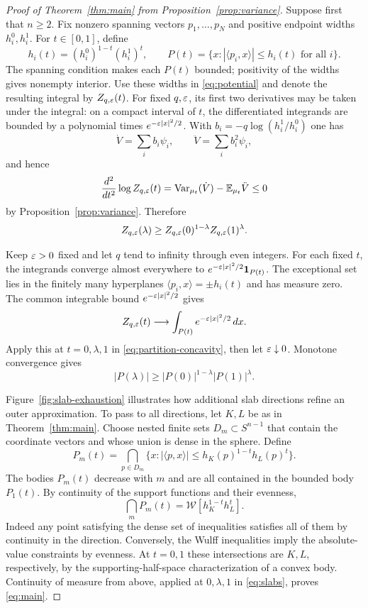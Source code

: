 \begin{proof}[Proof of Theorem~\ref{thm:main} from Proposition~\ref{prop:variance}]
Suppose first that $n\ge2$. Fix nonzero spanning vectors
$p_1,\ldots,p_N$ and positive endpoint widths $h_i^0,h_i^1$. For
$t\in[0,1]$, define
\[
 h_i(t)=(h_i^0)^{1-t}(h_i^1)^t,\qquad
 P(t)=\{x:|\langle p_i,x\rangle|\le h_i(t)\text{ for all }i\}.
\]
The spanning condition makes each $P(t)$ bounded; positivity of the
widths gives nonempty interior. Use these widths in \eqref{eq:potential}
and denote the resulting integral by $Z_{q,\varepsilon}(t)$.
For fixed $q,\varepsilon$, its first two derivatives may be taken under the
integral: on a compact interval of $t$, the differentiated integrands
are bounded by a polynomial times $e^{-\varepsilon|x|^2/2}$.
With $b_i=-q\log(h_i^1/h_i^0)$ one has
\[
 \dot V=\sum_i b_i\psi_i,\qquad
 \ddot V=\sum_i b_i^2\psi_i,
\]
and hence
\[
 \frac{d^2}{dt^2}\log Z_{q,\varepsilon}(t)
 =\operatorname{Var}_{\mu_t}(\dot V)-\mathbb E_{\mu_t}\ddot V\le0
\]
by Proposition~\ref{prop:variance}. Therefore
\begin{equation}\label{eq:partition-concavity}
 Z_{q,\varepsilon}(\lambda)\ge
 Z_{q,\varepsilon}(0)^{1-\lambda}Z_{q,\varepsilon}(1)^\lambda.
\end{equation}

Keep $\varepsilon>0$ fixed and let $q$ tend to infinity through even integers.
For each fixed $t$, the integrands converge almost everywhere to
$e^{-\varepsilon|x|^2/2}\mathbf1_{P(t)}$. The exceptional set lies in the
finitely many hyperplanes $\langle p_i,x\rangle=\pm h_i(t)$ and
has measure zero. The common integrable bound
$e^{-\varepsilon|x|^2/2}$ gives
\[
 Z_{q,\varepsilon}(t)\longrightarrow
 \int_{P(t)}e^{-\varepsilon|x|^2/2}\,dx.
\]
Apply this at $t=0,\lambda,1$ in \eqref{eq:partition-concavity}, then
let $\varepsilon\downarrow0$. Monotone convergence gives
\begin{equation}\label{eq:slabs}
 |P(\lambda)|\ge |P(0)|^{1-\lambda}|P(1)|^\lambda.
\end{equation}



Figure~\ref{fig:slab-exhaustion} illustrates how additional slab
directions refine an outer approximation.  To pass to all directions,
let $K,L$ be as in Theorem~\ref{thm:main}. Choose nested finite
sets $D_m\subset S^{n-1}$ that contain the coordinate vectors and
whose union is dense in the sphere. Define
\[
 P_m(t)=\bigcap_{p\in D_m}
 \{x:|\langle p,x\rangle|\le h_K(p)^{1-t}h_L(p)^t\}.
\]
The bodies $P_m(t)$ decrease with $m$ and are all contained in the bounded
body $P_1(t)$. By continuity of the support functions and their
evenness,
\[
 \bigcap_m P_m(t)=\mathcal W[h_K^{1-t}h_L^t].
\]
Indeed any point satisfying the dense set of inequalities satisfies
all of them by continuity in the direction. Conversely, the Wulff
inequalities imply the absolute-value constraints by evenness.
At $t=0,1$ these intersections are $K,L$, respectively, by the
supporting-half-space characterization of a convex body.
Continuity of measure from above, applied at $0,\lambda,1$ in
\eqref{eq:slabs}, proves \eqref{eq:main}.


\end{proof}
